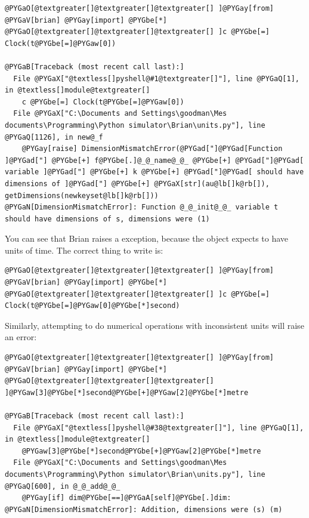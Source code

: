 \documentclass[letterpaper,10pt,english]{manual}
\begin{document}
\begin{Verbatim}[commandchars=@\[\]]
@PYGaO[@textgreater[]@textgreater[]@textgreater[] ]@PYGay[from] @PYGaV[brian] @PYGay[import] @PYGbe[*]
@PYGaO[@textgreater[]@textgreater[]@textgreater[] ]c @PYGbe[=] Clock(t@PYGbe[=]@PYGaw[0])

@PYGaB[Traceback (most recent call last):]
  File @PYGaX["@textless[]pyshell@#1@textgreater[]"], line @PYGaQ[1], in @textless[]module@textgreater[]
    c @PYGbe[=] Clock(t@PYGbe[=]@PYGaw[0])
  File @PYGaX["C:\Documents and Settings\goodman\Mes documents\Programming\Python simulator\Brian\units.py"], line @PYGaQ[1126], in new@_f
    @PYGay[raise] DimensionMismatchError(@PYGad["]@PYGad[Function ]@PYGad["] @PYGbe[+] f@PYGbe[.]@_@_name@_@_ @PYGbe[+] @PYGad["]@PYGad[ variable ]@PYGad["] @PYGbe[+] k @PYGbe[+] @PYGad["]@PYGad[ should have dimensions of ]@PYGad["] @PYGbe[+] @PYGaX[str](au@lb[]k@rb[]), getDimensions(newkeyset@lb[]k@rb[]))
@PYGaN[DimensionMismatchError]: Function @_@_init@_@_ variable t should have dimensions of s, dimensions were (1)
\end{Verbatim}

You can see that Brian raises a  exception, because the
\hyperlink{brian.Clock}{} object expects  to have units of time. The correct thing to write is:

\begin{Verbatim}[commandchars=@\[\]]
@PYGaO[@textgreater[]@textgreater[]@textgreater[] ]@PYGay[from] @PYGaV[brian] @PYGay[import] @PYGbe[*]
@PYGaO[@textgreater[]@textgreater[]@textgreater[] ]c @PYGbe[=] Clock(t@PYGbe[=]@PYGaw[0]@PYGbe[*]second)
\end{Verbatim}

Similarly, attempting to do numerical operations with inconsistent units will
raise an error:

\begin{Verbatim}[commandchars=@\[\]]
@PYGaO[@textgreater[]@textgreater[]@textgreater[] ]@PYGay[from] @PYGaV[brian] @PYGay[import] @PYGbe[*]
@PYGaO[@textgreater[]@textgreater[]@textgreater[] ]@PYGaw[3]@PYGbe[*]second@PYGbe[+]@PYGaw[2]@PYGbe[*]metre

@PYGaB[Traceback (most recent call last):]
  File @PYGaX["@textless[]pyshell@#38@textgreater[]"], line @PYGaQ[1], in @textless[]module@textgreater[]
    @PYGaw[3]@PYGbe[*]second@PYGbe[+]@PYGaw[2]@PYGbe[*]metre
  File @PYGaX["C:\Documents and Settings\goodman\Mes documents\Programming\Python simulator\Brian\units.py"], line @PYGaQ[600], in @_@_add@_@_
    @PYGay[if] dim@PYGbe[==]@PYGaA[self]@PYGbe[.]dim:
@PYGaN[DimensionMismatchError]: Addition, dimensions were (s) (m)
\end{Verbatim}
\end{document}
